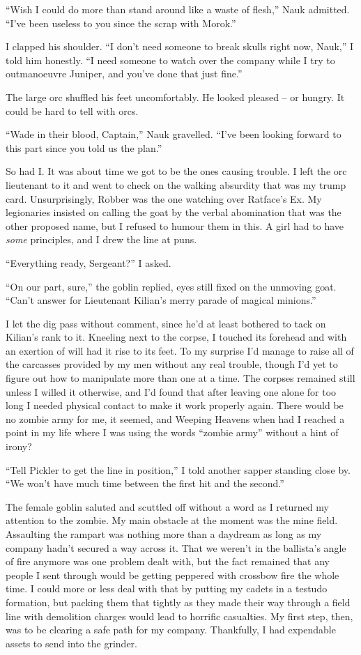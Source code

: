 \documentclass[12pt, openany]{book}
\begin{document}
“Wish I could do more than stand around like a waste of flesh,” Nauk admitted. “I’ve been useless to you since the scrap with Morok.”

I clapped his shoulder. “I don’t need someone to break skulls right now, Nauk,” I told him honestly. “I need someone to watch over the company while I try to outmanoeuvre Juniper, and you’ve done that just fine.”

The large orc shuffled his feet uncomfortably. He looked pleased – or hungry. It could be hard to tell with orcs.

“Wade in their blood, Captain,” Nauk gravelled. “I’ve been looking forward to this part since you told us the plan.”

So had I. It was about time we got to be the ones causing trouble. I left the orc lieutenant to it and went to check on the walking absurdity that was my trump card. Unsurprisingly, Robber was the one watching over Ratface’s Ex. My legionaries insisted on calling the goat by the verbal abomination that was the other proposed name, but I refused to humour them in this. A girl had to have \textit{some} principles, and I drew the line at puns.

“Everything ready, Sergeant?” I asked.

“On our part, sure,” the goblin replied, eyes still fixed on the unmoving goat. “Can’t answer for Lieutenant Kilian’s merry parade of magical minions.”

I let the dig pass without comment, since he’d at least bothered to tack on Kilian’s rank to it. Kneeling next to the corpse, I touched its forehead and with an exertion of will had it rise to its feet. To my surprise I’d manage to raise all of the carcasses provided by my men without any real trouble, though I’d yet to figure out how to manipulate more than one at a time. The corpses remained still unless I willed it otherwise, and I’d found that after leaving one alone for too long I needed physical contact to make it work properly again. There would be no zombie army for me, it seemed, and Weeping Heavens when had I reached a point in my life where I was using the words “zombie army” without a hint of irony?

“Tell Pickler to get the line in position,” I told another sapper standing close by. “We won’t have much time between the first hit and the second.”

The female goblin saluted and scuttled off without a word as I returned my attention to the zombie. My main obstacle at the moment was the mine field. Assaulting the rampart was nothing more than a daydream as long as my company hadn’t secured a way across it. That we weren’t in the ballista’s angle of fire anymore was one problem dealt with, but the fact remained that any people I sent through would be getting peppered with crossbow fire the whole time. I could more or less deal with that by putting my cadets in a testudo formation, but packing them that tightly as they made their way through a field line with demolition charges would lead to horrific casualties. My first step, then, was to be clearing a safe path for my company. Thankfully, I had expendable assets to send into the grinder.
\end{document}
